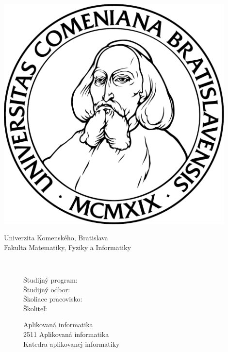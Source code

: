 \begin{titlepage}
	\begin{minipage}{0.2\textwidth}
	\includegraphics[width=0.9\textwidth]{komlogo-new.pdf}
	\end{minipage}
	\begin{minipage}{0.8\textwidth}
	\begin{center}
		\sc
		Univerzita Komenského, Bratislava \\
		Fakulta Matematiky, Fyziky a Informatiky 
	\end{center}
	\end{minipage}
	
	\vspace*{\fill}
	\begin{center}
	{\LARGE\sc\mftitle} \\
	\smallskip	
	\mfthesistype
	\end{center}
	\vspace*{\fill}
	
	\begin{figure}[!h]
		\bigskip
		\bigskip
		\begin{minipage}[h]{0.3\textwidth}
		  Študijný program: 	    \\
		  Študijný odbor:			\\
		  Školiace pracovisko: 	\\
		  Školiteľ: 				
		\end{minipage}
		\begin{minipage}[h]{0.5\textwidth}
		  Aplikovaná informatika 	    \\
		  2511 Aplikovaná informatika 	    \\
		  Katedra aplikovanej informatiky 	    \\
		  \mfadvisor 	    
		  \end{minipage}
	\end{figure}
	
	\begin{figure}
		\smallskip
		\smallskip
		\textbf{\mfplacedate} \\
		\hspace{1pt} \textbf{\mfauthor}
	\end{figure}
\end{titlepage}